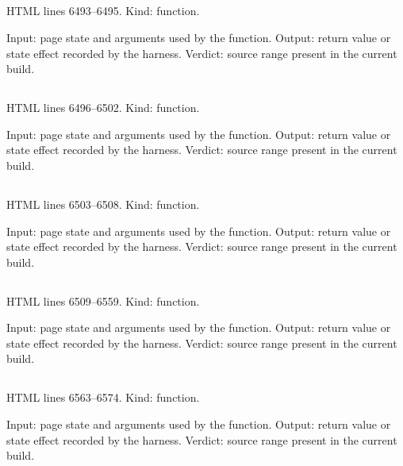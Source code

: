 \subsection*{\texttt{}}
\label{vf_312_ccValue}
HTML lines 6493--6495. Kind: function.

Input: page state and arguments used by the function.
Output: return value or state effect recorded by the harness.
Verdict: source range present in the current build.

\subsection*{\texttt{}}
\label{vf_313_ccXAxis}
HTML lines 6496--6502. Kind: function.

Input: page state and arguments used by the function.
Output: return value or state effect recorded by the harness.
Verdict: source range present in the current build.

\subsection*{\texttt{}}
\label{vf_314_ccSpec}
HTML lines 6503--6508. Kind: function.

Input: page state and arguments used by the function.
Output: return value or state effect recorded by the harness.
Verdict: source range present in the current build.

\subsection*{\texttt{}}
\label{vf_315_ccCompute}
HTML lines 6509--6559. Kind: function.

Input: page state and arguments used by the function.
Output: return value or state effect recorded by the harness.
Verdict: source range present in the current build.

\subsection*{\texttt{}}
\label{vf_316_ccShift}
HTML lines 6563--6574. Kind: function.

Input: page state and arguments used by the function.
Output: return value or state effect recorded by the harness.
Verdict: source range present in the current build.

